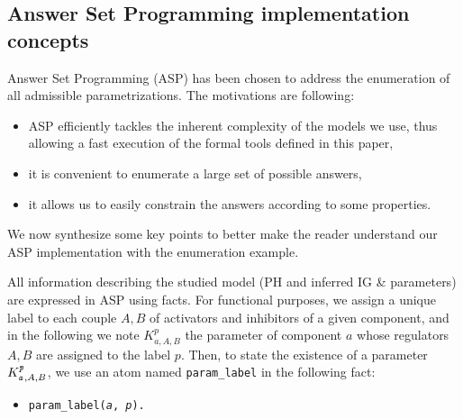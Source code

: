 \begin{comment}
\begin{definition}[Admissible parametrization \& Admissible parametrization with respect to inferred parameters]
\label{def:param_enum_inf}
Let $\PH = (\PHs, \PHl, \PHh)$ be a PH so that IG inference is possible, and $\IG = (\Gamma, E_+,
E_-)$ the inferred IG.
A parametrization $K$ on $\IG$ is said to be \emph{admissible} iff it respects
the extreme values assumption, the activity assumption and the monotonicity assumption.
A parametrization $K$ on $\IG$ is said to be \emph{admissible with respect to the
inferred parameters} iff it is admissible and that all parameters that can be inferred regarding
\pref{pps:param_K} are equal to their inferred value.
\end{definition}

\todo{utilité de “Admissible parametrization” seul ?}
\end{comment}


\subsection{Answer Set Programming implementation concepts}

\newcommand{\ti}[1]{\texttt{\textit{#1}}}
\newcommand{\aspil}[1]{\texttt{#1}}
\newcommand{\asp}[1]{\begin{itemize} \item[] \aspil{#1} \end{itemize}}

Answer Set Programming (ASP) \cite{Baral03} has been chosen to address the enumeration of all admissible parametrizations.
The motivations are following:
\begin{itemize}
  \item ASP efficiently tackles the inherent complexity of the models we use, thus allowing a fast execution of the formal tools defined in this paper,
  \item it is convenient to enumerate a large set of possible answers,
  \item it allows us to easily constrain the answers according to some properties.
\end{itemize}
We now synthesize some key points to better make the reader understand our ASP implementation with the enumeration example.

All information describing the studied model (PH and inferred IG \& parameters) are expressed in ASP using facts.
For functional purposes, we assign a unique label to each couple $A,B$ of activators and inhibitors of a given component, and in the following we note $K^p_{a,A,B}$ the parameter of component $a$ whose regulators $A,B$ are assigned to the label $p$.
Then, to state the existence of a parameter $K^\ti{p}_{\ti{a},A,B}$, we use an atom named \aspil{param\_label} in the following fact:
\asp{param\_label(\ti{a}, \ti{p}).}

